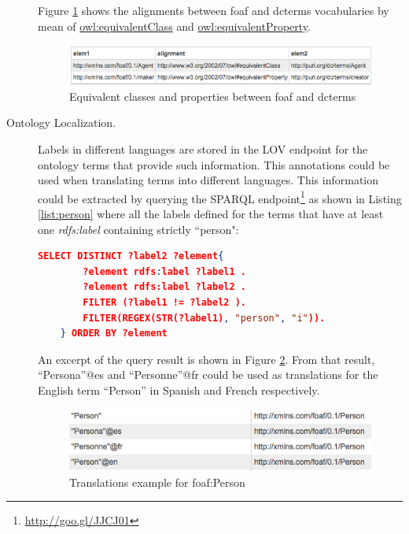 \documentclass{iosart2c}
\begin{document}
\begin{description}
\begin{lstlisting}[float=htb,caption={SPARQL query asking for all the equivalent classes and properties between the vocabularies foaf and dcterms. },label=list:alignment, language=json]
	\end{lstlisting}
	
	Figure \ref{fig:eqCR} shows the alignments between foaf and dcterms vocabularies by mean of \url{owl:equivalentClass} and \url{owl:equivalentProperty}.
    \begin{figure}
      \centering
      \includegraphics[width=1.0\linewidth]{equivalentCandR.png}
      \caption{Equivalent classes and properties between foaf and dcterms}
      \label{fig:eqCR}
    \end{figure}
    
 \item [Ontology Localization.] Labels in different languages are stored in the LOV endpoint for the ontology terms that provide such information. This annotations could be used when translating terms into different languages. This information could be extracted by querying the SPARQL endpoint\footnote{\url{http://goo.gl/JJCJ01}} as shown in Listing \ref{list:person} where all the labels defined for the terms that have at least one \emph{rdfs:label} containing strictly ``person":
		
    \begin{lstlisting}[float=htb,caption={SPARQL query asking all the labels defined for the terms containing person.},label=list:person, language=json]
    SELECT DISTINCT ?label2 ?element{
		?element rdfs:label ?label1 .
		?element rdfs:label ?label2 .
		FILTER (?label1 != ?label2 ).
		FILTER(REGEX(STR(?label1), "person", "i")).
	} ORDER BY ?element
	\end{lstlisting}
							
   An excerpt of the query result is shown in Figure \ref{fig:translations}. From that result, ``Persona''@es and ``Personne''@fr could be used as translations for the English term ``Person'' in Spanish and French respectively. 
   
   \begin{figure}[ht!b]
     \centering
     \includegraphics[width=.90\linewidth]{translations1.png}
     \caption{Translations example for foaf:Person}
     \label{fig:translations}
   \end{figure}
   
\end{description}
\end{document}
